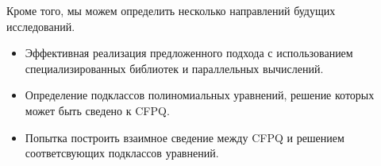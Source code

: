 \documentclass[12pt]{matmex-diploma-custom}
\begin{document}
Кроме того, мы можем определить несколько направлений будущих исследований. 

\begin{itemize}
    \item Эффективная реализация предложенного подхода с использованием специализированных библиотек и параллельных вычислений.
    \item Определение подклассов полиномиальных уравнений, решение которых может быть сведено к CFPQ.
    \item Попытка построить взаимное сведение между CFPQ и решением соответсвующих подклассов уравнений.
\end{itemize}

\setmonofont[Mapping=tex-text]{CMU Typewriter Text}


\end{document}
